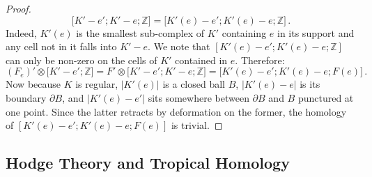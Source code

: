 \documentclass[AHL,Unicode,longabstracts,published]{cedram}
\newcommand{\Z}{\mathbb{Z}}
\begin{document}
\begin{proof}
\begin{equation*}
\big[K'-e';K'-e;\Z\big]=\big[K'(e)-e';K'(e)-e;\Z\big]\,.
\end{equation*}
Indeed, $K'(e)$ is the smallest sub-complex of $K'$ containing $e$ in its support and any cell not in it falls into $K'-e$. We note that $[K'(e)-e';K'(e)-e;\Z]$ can only be non-zero on the cells of $K'$ contained in $e$. Therefore:
\begin{equation*}
(F_e)'\otimes \big[K'-e';\Z\big]= F'\otimes\big[K'-e';K'-e;\Z\big] = \big[K'(e)-e';K'(e)-e;F(e)\big]\,.
\end{equation*}
Now because $K$ is regular, $|K'(e)|$ is a closed ball $B$, $|K'(e)-e|$ is its boundary $\partial B$, and $|K'(e)-e'|$ sits somewhere between $\partial B$ and $B$ punctured at one point. Since the latter retracts by deformation on the former, the homology of ${[K'(e)-e';K'(e)-e;F(e)]}$ is trivial.
\end{proof}

\subsection{Hodge Theory and Tropical Homology}
\end{document}
